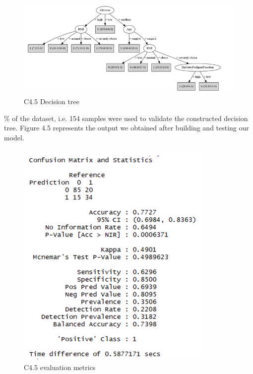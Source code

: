 \begin{figure}[h]
\centering
\includegraphics[scale=1.0]{c45.PNG}
\caption{\label{fig:subBDDs1}C4.5 Decision tree}
\end{figure}
\par \noindent
{}\% of the dataset, i.e. 154 samples were used to validate the constructed decision tree. Figure 4.5 represents the output we obtained after building and testing our model.
\begin{figure}[h]
\centering
\includegraphics[scale=1.0]{c45eval.PNG}
\caption{\label{fig:subBDDs1}C4.5 evaluation metrics}
\end{figure}
\pagebreak



